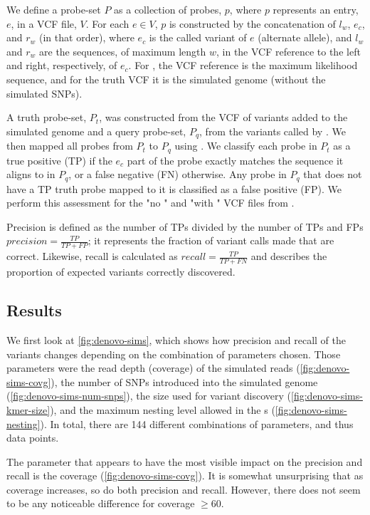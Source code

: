 We define a probe-set $P$ as a collection of probes, $p$, where $p$ represents an entry, $e$, in a VCF file, $V$. For each $e \in V$, $p$ is constructed by the concatenation of $l_w$, $e_c$, and $r_w$ (in that order), where $e_c$ is the called variant of $e$ (alternate allele), and $l_w$ and $r_w$ are the sequences, of maximum length $w$, in the VCF reference to the left and right, respectively, of $e_c$. For \pandora{}, the VCF reference is the maximum likelihood sequence, and for the truth VCF it is the simulated genome (without the simulated SNPs).

A truth probe-set, $P_t$, was constructed from the VCF of variants added to the simulated genome and a query probe-set, $P_q$, from the variants called by \pandora{}. We then mapped all probes from $P_t$ to $P_q$ using  \cite{li2013}. We classify each probe in $P_t$ as a true positive (TP) if the $e_c$ part of the probe exactly matches the sequence it aligns to in $P_q$, or a false negative (FN) otherwise. Any probe in $P_q$ that does not have a TP truth probe mapped to it is classified as a false positive (FP). We perform this assessment for the "no \denovo{}" and "with \denovo{}" VCF files from \pandora{}. 

Precision is defined as the number of TPs divided by the number of TPs and FPs $precision=\frac{TP}{TP+FP}$; it represents the fraction of variant calls made that are correct. Likewise, recall is calculated as $recall=\frac{TP}{TP+FN}$ and describes the proportion of expected variants correctly discovered.

\subsection{Results}
\label{sec:denovo-sims-results}

We first look at \autoref{fig:denovo-sims}, which shows how precision and recall of the \pandora{} \denovo{} variants changes depending on the combination of parameters chosen. Those parameters were the read depth (coverage) of the simulated reads (\autoref{fig:denovo-sims-covg}), the number of SNPs introduced into the simulated genome (\autoref{fig:denovo-sims-num-snps}), the \kmer{} size used for variant discovery (\autoref{fig:denovo-sims-kmer-size}), and the maximum nesting level allowed in the \prg{}s (\autoref{fig:denovo-sims-nesting}). In total, there are 144 different combinations of parameters, and thus data points.

The parameter that appears to have the most visible impact on the precision and recall is the coverage (\autoref{fig:denovo-sims-covg}). It is somewhat unsurprising that as coverage increases, so do both precision and recall. However, there does not seem to be any noticeable difference for coverage $\ge 60$.

